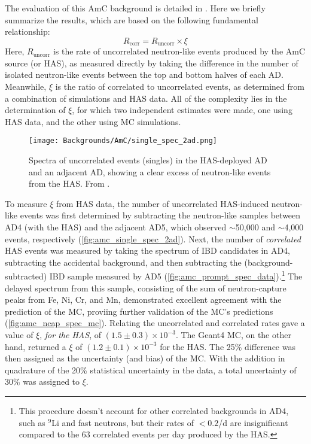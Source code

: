 \documentclass[../thesis.tex]{subfiles}
\begin{document}
The evaluation of this AmC background is detailed in \cite{Gu_2016}. Here we briefly summarize the results, which are based on the following fundamental relationship:
\begin{equation}
  \label{eq:bkgAmcFundamental}
  R_{\mathrm{corr}} = R_{\mathrm{uncorr}} \times \xi
\end{equation}
Here, $R_{\mathrm{uncorr}}$ is the rate of uncorrelated neutron-like events produced by the AmC source (or HAS), as measured directly by taking the difference in the number of isolated neutron-like events between the top and bottom halves of each AD. Meanwhile, $\xi$ is the ratio of correlated to uncorrelated events, as determined from a combination of simulations and HAS data. All of the complexity lies in the determination of $\xi$, for which two independent estimates were made, one using HAS data, and the other using MC simulations.

\begin{figure}[ht]
  \texttt{[image: Backgrounds/AmC/single\_spec\_2ad.png]}
  \caption{Spectra of uncorrelated events (singles) in the HAS-deployed AD and an adjacent AD, showing a clear excess of neutron-like events from the HAS. From \cite{Gu_2016}.}
  \label{fig:amc_single_spec_2ad}
\end{figure}

To measure $\xi$ from HAS data, the number of uncorrelated HAS-induced neutron-like events was first determined by subtracting the neutron-like samples between AD4 (with the HAS) and the adjacent AD5, which observed $\sim$50,000 and $\sim$4,000 events, respectively (\autoref{fig:amc_single_spec_2ad}). Next, the number of \emph{correlated} HAS events was measured by taking the spectrum of IBD candidates in AD4, subtracting the accidental background, and then subtracting the (background-subtracted) IBD sample measured by AD5 (\autoref{fig:amc_prompt_spec_data}).\footnote{This procedure doesn't account for other correlated backgrounds in AD4, such as $^9$Li and fast neutrons, but their rates of $< 0.2$/d are insignificant compared to the 63 correlated events per day produced by the HAS.} The delayed spectrum from this sample, consisting of the sum of neutron-capture peaks from Fe, Ni, Cr, and Mn, demonstrated excellent agreement with the prediction of the MC, proviing further validation of the MC's predictions (\autoref{fig:amc_ncap_spec_mc}). Relating the uncorrelated and correlated rates gave a value of $\xi$, \emph{for the HAS}, of $(1.5\pm0.3)\times10^{-3}$. The Geant4 MC, on the other hand, returned a $\xi$ of $(1.2\pm0.1)\times10^{-3}$ for the HAS. The 25\% difference was then assigned as the uncertainty (and bias) of the MC. With the addition in quadrature of the 20\% statistical uncertainty in the data, a total uncertainty of 30\% was assigned to $\xi$.
\end{document}
